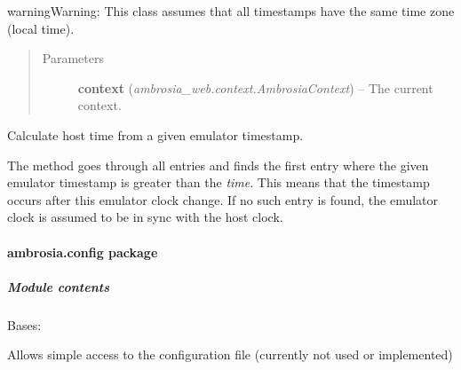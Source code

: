 \documentclass[letterpaper,10pt,english]{sphinxmanual}
\begin{document}
\begin{fulllineitems}
\begin{notice}{warning}{Warning:}
This class assumes that all timestamps have the same time zone (local time).
\end{notice}
\begin{quote}\begin{description}
\item[{Parameters}] \leavevmode
\textbf{context} (\emph{ambrosia\_web.context.AmbrosiaContext}) -- The current context.

\end{description}\end{quote}

\begin{fulllineitems}
\label{ambrosia.clocks:ambrosia.clocks.ClockSyncer.emu_time}
Calculate host time from a given emulator timestamp.

The method goes through all entries and finds the first entry where the given emulator timestamp is greater than
the \emph{time}. This means that the timestamp occurs after this emulator clock change. If no such entry is found,
the emulator clock is assumed to be in sync with the host clock.

\end{fulllineitems}


\end{fulllineitems}



\paragraph{ambrosia.config package}
\label{ambrosia.config:ambrosia-config-package}\label{ambrosia.config::doc}

\subparagraph{Module contents}
\label{ambrosia.config:module-ambrosia.config}\label{ambrosia.config:module-contents}

\begin{fulllineitems}
\label{ambrosia.config:ambrosia.config.Config}
Bases: 

Allows simple access to the configuration file (currently not used or implemented)

\end{fulllineitems}
\end{document}
